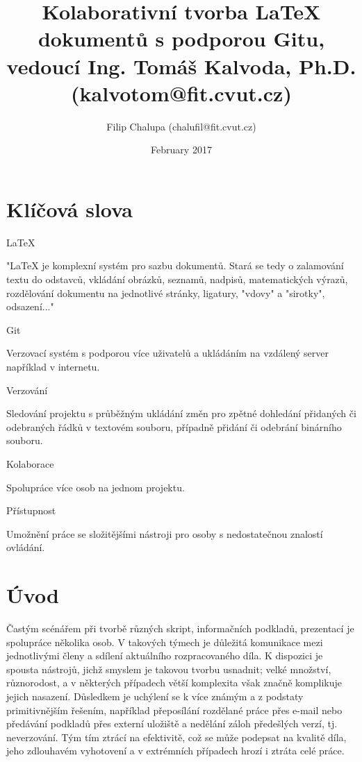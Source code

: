 \documentclass{article}
\title{Kolaborativní tvorba LaTeX dokumentů s podporou Gitu, vedoucí Ing. Tomáš Kalvoda, Ph.D. (kalvotom@fit.cvut.cz)}
\author{Filip Chalupa (chalufil@fit.cvut.cz)}
\date{February 2017}
\begin{document}
\maketitle

\section{Klíčová slova}
LaTeX 

"LaTeX je komplexní systém pro sazbu dokumentů. Stará se tedy o zalamování textu do odstavců, vkládání obrázků, seznamů, nadpisů, matematických výrazů, rozdělování dokumentu na jednotlivé stránky, ligatury, "vdovy" a "sirotky", odsazení..." \citep{cit1}

Git

Verzovací systém s podporou více uživatelů a ukládáním na vzdálený server například v internetu.

Verzování

Sledování projektu s průběžným ukládání změn pro zpětné dohledání přidaných či odebraných řádků v textovém souboru, případně přidání či odebrání binárního souboru.

Kolaborace

Spolupráce více osob na jednom projektu.

Přístupnost

Umožnění práce se složitějšími nástroji pro osoby s nedostatečnou znalostí ovládání.

\section{Úvod}

Častým scénářem při tvorbě různých skript, informačních podkladů, prezentací je spolupráce několika osob. V takových týmech je důležitá komunikace mezi jednotlivými členy a sdílení aktuálního rozpracovaného díla. K dispozici je spousta nástrojů, jichž smyslem je takovou tvorbu usnadnit; velké množství, různorodost, a v některých případech větší komplexita však značně komplikuje jejich nasazení. Důsledkem je uchýlení se k více známým a z podstaty primitivnějším řešením, například přeposílání rozdělané práce přes e-mail nebo předávání podkladů přes externí uložiště a nedělání záloh předešlých verzí, tj. neverzování. Tým tím ztrácí na efektivitě, což se může podepsat na kvalitě díla, jeho zdlouhavém vyhotovení a v extrémních případech hrozí i ztráta celé práce.
\end{document}
